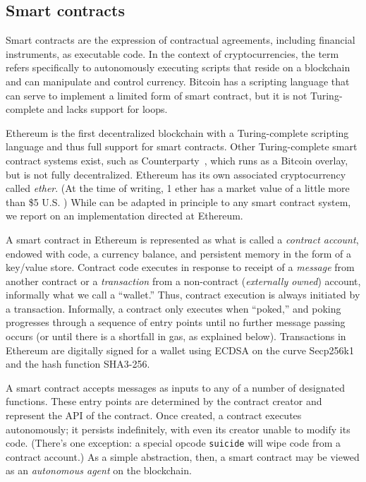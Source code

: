 \subsection{Smart contracts}
\label{sec:contracts-and-gas}

Smart contracts are the expression of contractual agreements, including financial instruments, as executable code. In the context of cryptocurrencies, the term refers specifically to autonomously executing scripts that reside on a blockchain and can manipulate and control currency. Bitcoin has a scripting language that can serve to implement a limited form of smart contract, but it is not Turing-complete and lacks support for loops. 

Ethereum is the first decentralized blockchain with a Turing-complete scripting language and thus full support for smart contracts. Other Turing-complete smart contract systems exist, such as Counterparty~\cite{}, which runs as a Bitcoin overlay, but is not fully decentralized. Ethereum has its own associated cryptocurrency called \emph{ether}. (At the time of writing, 1 ether has a market value of a little more than \$5 U.S. ) While \tc can be adapted in principle to any smart contract system, we report on an implementation directed at Ethereum.

A smart contract in Ethereum is represented as what is called a \emph{contract account}, endowed with code, a currency balance, and persistent memory in the form of a key/value store. Contract code executes in response to receipt of a \emph{message} from another contract or a \emph{transaction} from a non-contract (\emph{externally owned}) account, informally what we call a ``wallet.'' Thus, contract execution is always initiated by a transaction. Informally, a contract only executes when ``poked,'' and poking progresses through a sequence of entry points until no further message passing occurs (or until there is a shortfall in gas, as explained below). Transactions in Ethereum are digitally signed for a wallet using ECDSA on the curve Secp256k1 and the hash function SHA3-256. 

A smart contract accepts messages as inputs to any of a number of designated functions. These entry points are determined by the contract creator and represent the API of the contract. Once created, a contract executes autonomously; it persists indefinitely, with even its creator unable to modify its code. (There's one exception: a special opcode \texttt{suicide} will wipe code from a contract account.) As a simple abstraction, then, a smart contract may be viewed as an {\em autonomous agent} on the blockchain.  

